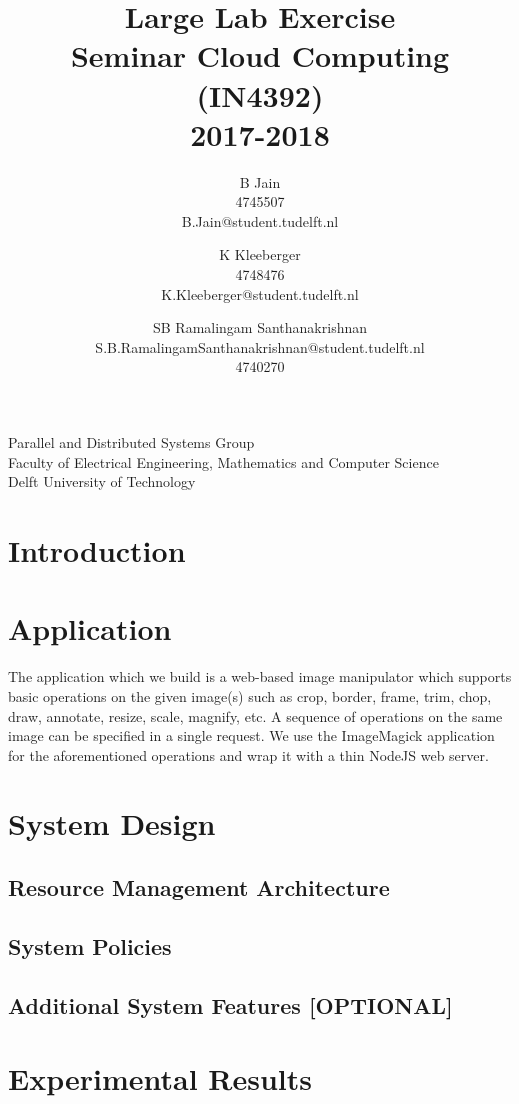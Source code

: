 \documentclass[a4paper]{article}
\title{
  Large Lab Exercise \\
  Seminar Cloud Computing (IN4392)\\
  2017-2018
}
\date{}
\author{
  \newblock
  B Jain \\
  4745507 \\
  B.Jain@student.tudelft.nl
  \and
  \newblock
  K Kleeberger \\
  4748476 \\
  K.Kleeberger@student.tudelft.nl
  \and
  \newblock
  SB Ramalingam Santhanakrishnan\\
  S.B.RamalingamSanthanakrishnan@student.tudelft.nl \\
  4740270
}
\begin{document}
{\raggedright{
Parallel and Distributed Systems Group\\
Faculty of Electrical Engineering, Mathematics and Computer Science\\
Delft University of Technology
}}

{\let\newpage\relax\maketitle}

\abstract{}

\section{Introduction}

\section{Application}

The application which we build is a web-based image manipulator which
supports basic operations on the given image(s) such as crop, border, 
frame, trim, chop, draw, annotate, resize, scale, magnify, etc. 
A sequence of operations on the same image can be specified in a single
request. We use the ImageMagick\cite{imagemagick} application for the
aforementioned operations and wrap it with a thin NodeJS\cite{nodejs} web server.

\section{System Design}

\subsection{Resource Management Architecture}

\subsection{System Policies}

\subsection{Additional System Features [OPTIONAL]}

\section{Experimental Results}
\end{document}

